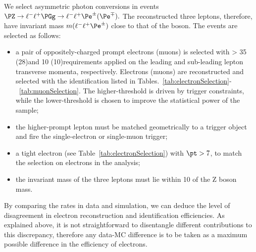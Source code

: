 
We select asymmetric photon conversions in events
\(\PZ\to\ell^-\ell^+\PGg\to\ell^-\ell^+\Pe^\pm(\Pe^\mp).\)
The reconstructed three leptons,
therefore, have invariant mass
\(m(\ell^-\ell^+\Pe^\pm)\)
close to that of the \PZ boson.
The events are selected as follows:
\begin{itemize}
\setlength\itemsep{-0.2em}
\item a pair of oppositely-charged prompt electrons (muons) is selected with \pt > 35 (28)\GeV and
10 (10)\GeV requirements applied on the leading and sub-leading lepton transverse momenta,
 respectively. Electrons (muons) are reconstructed and selected with
 the identification listed in Tables.~\ref{tab:electronSelection}-~\ref{tab:muonSelection}.
  The higher-\pt threshold is driven by trigger constraints, while the
  lower-\pt threshold is chosen to improve the statistical power of
  the sample; 
\item the higher-\pt prompt lepton must be matched geometrically to a
  trigger object and fire the single-electron or single-muon trigger;
\item a \displ tight electron (see
  Table~\ref{tab:electronSelection}) with $\pt>7$\GeV, to match the
  selection on \displ electrons in the analysis;
\item the invariant mass of the three leptons must lie within 10\GeV
  of the Z boson mass.
\end{itemize}
By comparing the rates in data and simulation, we can deduce the level
of disagreement in \displ electron reconstruction and
identification efficiencies.
As explained above, it is not straightforward to disentangle different
contributions to this discrepancy, therefore any data-MC difference is
to be taken as a maximum possible difference in the efficiency of
\displ electrons.

